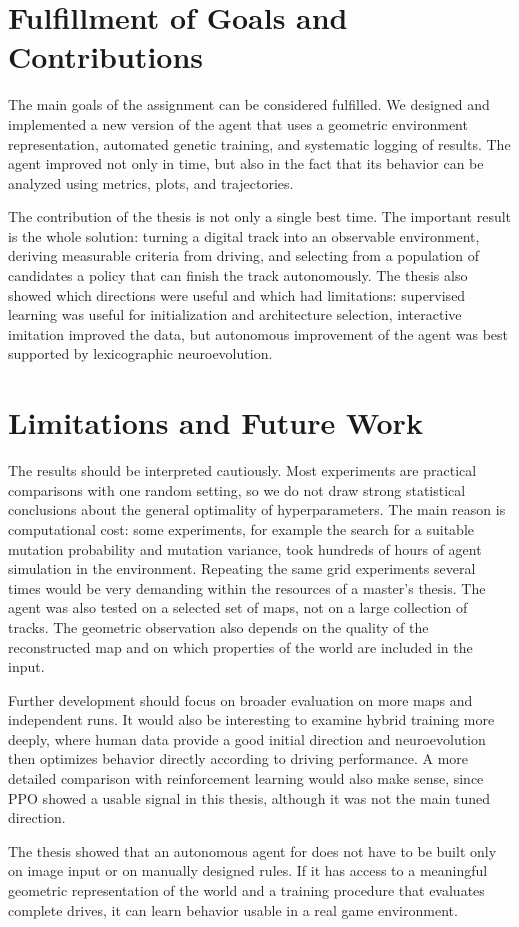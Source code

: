 \section*{Fulfillment of Goals and Contributions}

The main goals of the assignment can be considered fulfilled. We designed and implemented a new version of the agent that uses a geometric environment representation, automated genetic training, and systematic logging of results. The agent improved not only in time, but also in the fact that its behavior can be analyzed using metrics, plots, and trajectories.

The contribution of the thesis is not only a single best time. The important result is the whole solution: turning a digital track into an observable environment, deriving measurable criteria from driving, and selecting from a population of candidates a policy that can finish the track autonomously. The thesis also showed which directions were useful and which had limitations: supervised learning was useful for initialization and architecture selection, interactive imitation improved the data, but autonomous improvement of the agent was best supported by lexicographic neuroevolution.

\section*{Limitations and Future Work}

The results should be interpreted cautiously. Most experiments are practical comparisons with one random setting, so we do not draw strong statistical conclusions about the general optimality of hyperparameters. The main reason is computational cost: some experiments, for example the search for a suitable mutation probability and mutation variance, took hundreds of hours of agent simulation in the environment. Repeating the same grid experiments several times would be very demanding within the resources of a master's thesis. The agent was also tested on a selected set of maps, not on a large collection of tracks. The geometric observation also depends on the quality of the reconstructed map and on which properties of the world are included in the input.

Further development should focus on broader evaluation on more maps and independent runs. It would also be interesting to examine hybrid training more deeply, where human data provide a good initial direction and neuroevolution then optimizes behavior directly according to driving performance. A more detailed comparison with reinforcement learning would also make sense, since PPO showed a usable signal in this thesis, although it was not the main tuned direction.

The thesis showed that an autonomous agent for \Trackmania{} does not have to be built only on image input or on manually designed rules. If it has access to a meaningful geometric representation of the world and a training procedure that evaluates complete drives, it can learn behavior usable in a real game environment.
